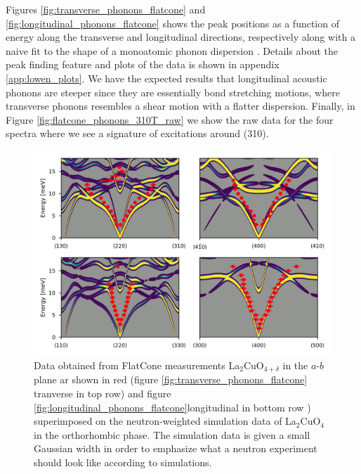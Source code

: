 Figures \ref{fig:transverse_phonons_flatcone} and \ref{fig:longitudinal_phonons_flatcone} shows the peak positions as a function of energy along the transverse and longitudinal directions, respectively along with a naive fit to the shape of a monoatomic phonon dispersion \cite{Kittel2005}. Details about the peak finding feature and plots of the data is shown in appendix \ref{app:lowen_plots}. We have the expected results that longitudinal acoustic phonons are steeper since they are essentially bond stretching motions, where transverse phonons resembles a shear motion with a flatter dispersion. Finally, in Figure \ref{fig:flatcone_phonons_310T_raw} we show the raw data for the four spectra where we see a signature of excitations around (310).

\begin{figure}
    \centering
    \includegraphics[width=\textwidth]{fig/lowen/flatcone_fits_simulation_lto_afm.png}
    \caption[FlatCone dispersion and neutron weighted simulation data]{Data obtained from FlatCone measurements La$_2$CuO$_{4+\delta}$ in the $a$-$b$ plane  ar shown in red (figure \ref{fig:transverse_phonons_flatcone} tranverse in top row) and figure \ref{fig:longitudinal_phonons_flatcone}longitudinal in bottom row ) superimposed on the neutron-weighted simulation data of La$_2$CuO$_4$ in the orthorhombic phase. The simulation data is given a small Gaussian width in order to emphasize what a neutron experiment should look like according to simulations.}
    \label{fig:flatcone_phonons_dispersion_simulation}
\end{figure}

